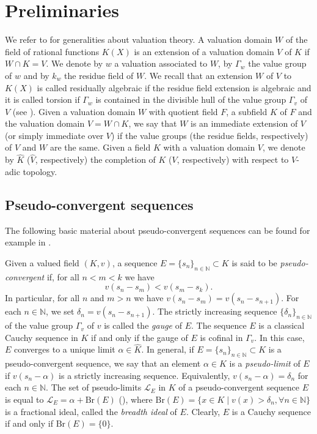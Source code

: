 \documentclass[10pt]{article}
\numberwithin{equation}{section}
\theoremstyle{definition}\newtheorem{Def}[equation]{Definition}
\theoremstyle{definition}\newtheorem{Ques}[equation]{Question}
\newcommand{\N}{\mathbb{N}}
\newcommand{\Br}{\text{Br}}
\newcommand{\K}{\widehat{K}}
\begin{document}
\section{Preliminaries}\label{prelim}

We refer to \cite{Bourb, EngPre, RibVal, ZS2} for generalities about valuation theory. A valuation domain $W$ of the field of rational functions $K(X)$ is an extension of  a valuation domain $V$ of $K$ if $W\cap K=V$. We denote by $w$ a valuation  associated to $W$, by $\Gamma_w$ the value group of $w$ and by $k_w$ the residue field of $W$. We recall that an extension $W$ of $V$ to $K(X)$ is called residually algebraic  if the residue field extension is algebraic and it is called torsion if $\Gamma_w$ is contained in the divisible hull of the value group $\Gamma_v$ of $V$ (see \cite{APZAll}). Given a valuation domain $W$ with quotient field $F$, a subfield $K$ of $F$ and the valuation domain $V=W\cap K$, we say that $W$ is an immediate extension of $V$ (or simply immediate over $V$) if the value groups (the residue fields, respectively) of $V$ and $W$ are the same. Given a field $K$ with a valuation domain $V$, we denote by $\widehat{K}$ ($\widehat V$, respectively) the completion of $K$ ($V$, respectively) with respect to $V$-adic topology.

\subsection{Pseudo-convergent sequences}\label{pcv}

The following basic material about pseudo-convergent sequences can be found for example in \cite{Kap, PS1,PS2}.

Given a valued field $(K,v)$, a  sequence $E=\{s_n\}_{n\in\N}\subset K$ is said to be \emph{pseudo-convergent} if, for all $n<m<k$ we have
$$v(s_n-s_m)<v(s_m-s_k).$$
In particular, for all $n$ and $m>n$ we have $v(s_n-s_m)=v(s_n-s_{n+1})$. For each $n\in\N$, we set $\delta_n=v(s_n-s_{n+1})$. The strictly increasing sequence $\{\delta_n\}_{n\in\N}$ of the value group $\Gamma_v$ of $v$ is called the \emph{gauge} of $E$. The sequence $E$ is a classical Cauchy sequence in $K$ if and only if the gauge of $E$ is cofinal in $\Gamma_v$. In this case, $E$ converges to a unique limit $\alpha\in\K$. In general, if $E=\{s_n\}_{n\in\N}\subset K$ is a pseudo-convergent sequence, we say that an element $\alpha\in K$ is a \emph{pseudo-limit} of $E$ if $v(s_n-\alpha)$ is a strictly increasing sequence. Equivalently, $v(s_n-\alpha)=\delta_n$ for each $n\in\N$. The set of pseudo-limits $\mathcal{L}_E$ in $K$ of a pseudo-convergent sequence $E$ is equal to $\mathcal{L}_E=\alpha+\Br(E)$ (\cite[Lemma 3]{Kap}), where $\Br(E)=\{x\in K\mid v(x)>\delta_n,\forall n\in\N\}$ is a fractional ideal, called the \emph{breadth ideal} of $E$. Clearly, $E$ is a Cauchy sequence if and only if $\Br(E)=\{0\}$.
\end{document}
